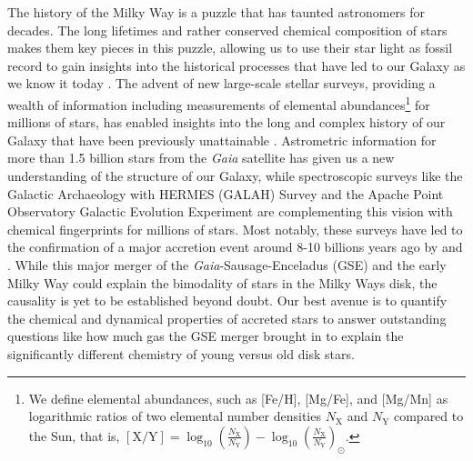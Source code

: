\documentclass[fleqn,usenatbib]{mnras}
\newcommand{\Gaia}{\textit{Gaia}\xspace} %
\begin{document}
The history of the Milky Way is a puzzle that has taunted astronomers for decades. The long lifetimes and rather conserved chemical composition of stars makes them key pieces in this puzzle, allowing us to use their star light as fossil record to gain insights into the historical processes that have led to our Galaxy as we know it today \citep{FreemanBlandHawthorn2002}. The advent of new large-scale stellar surveys, providing a wealth of information including measurements of elemental abundances\footnote{We define elemental abundances, such as [Fe/H], [Mg/Fe], and [Mg/Mn] as logarithmic ratios of two elemental number densities $N_\text{X}$ and $N_\text{Y}$ compared to the Sun, that is, $\left[\text{X/Y}\right]=\log_{10}\left(\frac{N_\text{X}}{N_\text{Y}}\right) -\log_{10}\left(\frac{N_\text{X}}{N_\text{Y}}\right)_\odot$.} for millions of stars, has enabled insights into the long and complex history of our Galaxy that have been previously unattainable \citep{Jofre2019}. Astrometric information for more than 1.5 billion stars from the \Gaia satellite \citep{Brown2016,Brown2018,Brown2021} has given us a new understanding of the structure of our Galaxy, while spectroscopic surveys like the Galactic Archaeology with HERMES (GALAH) Survey \citep{daSilva2015} and the Apache Point Observatory Galactic Evolution Experiment \citep[APOGEE,][]{Majewski2016} are complementing this vision with chemical fingerprints for millions of stars. Most notably, these surveys have led to the confirmation of a major accretion event around 8-10 billions years ago by \citet{Belokurov2018} and \citet{Helmi2018}. While this major merger of the \Gaia-Sausage-Enceladus (GSE) and the early Milky Way could explain the bimodality of stars in the Milky Ways disk, the causality is yet to be established beyond doubt. Our best avenue is to quantify the chemical and dynamical properties of accreted stars to answer outstanding questions like how much gas the GSE merger brought in to explain the significantly different chemistry of young versus old disk stars.
\end{document}
